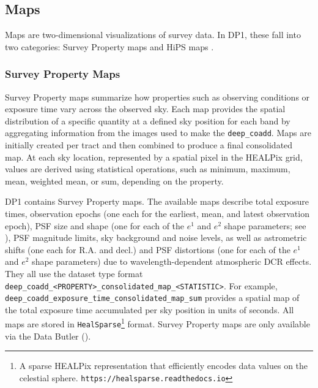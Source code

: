 \subsection{Maps}
Maps are two-dimensional visualizations of survey data.
In \gls{DP1}, these fall into two categories: Survey Property maps and \gls{HiPS} maps \citep[][]{2015A&A...578A.114F}.

\subsubsection{Survey Property Maps}
\label{ssec:survey_property_maps}
Survey Property maps \citep[][]{10.71929/rubin/2570315} summarize how properties such as observing conditions or exposure time vary across the observed sky.
Each map provides the spatial distribution of a specific quantity at a defined sky position for each band by aggregating information from the images used to make the \texttt{deep\_coadd}.
Maps are initially created per \gls{tract} and then combined to produce a final consolidated map.
At each sky location, represented by a spatial pixel in the \gls{HEALPix}\citep[][]{2005ApJ...622..759G} grid, values are derived using statistical operations, such as minimum, maximum, mean, weighted mean, or sum, depending on the property.

\gls{DP1} contains \nsurveypropertymaps Survey Property maps.
The available maps describe total exposure times, observation epochs (one each for the earliest, mean, and latest observation epoch), \gls{PSF} size and \gls{shape} (one for each of the $e^1$ and $e^2$ shape parameters; see ), \gls{PSF} magnitude limits, sky \gls{background} and noise levels, as well as astrometric shifts (one each for R.A. and decl.) and \gls{PSF} distortions (one for each of the $e^1$ and $e^2$ shape parameters) due to wavelength-dependent atmospheric \gls{DCR} effects.
They all use the dataset type  format \texttt{deep\_coadd\_<PROPERTY>\_consolidated\_map\_<STATISTIC>}.
For example, \texttt{deep\_coadd\_exposure\_time\_consolidated\_map\_sum} provides a spatial map of the total exposure time accumulated per
sky position in units of seconds.
All maps are stored in \texttt{HealSparse}\footnote{A sparse \gls{HEALPix} representation that efficiently encodes data values on the celestial sphere. \nolinkurl{https://healsparse.readthedocs.io}} format.
Survey Property maps are only available via the Data \gls{Butler} ().

